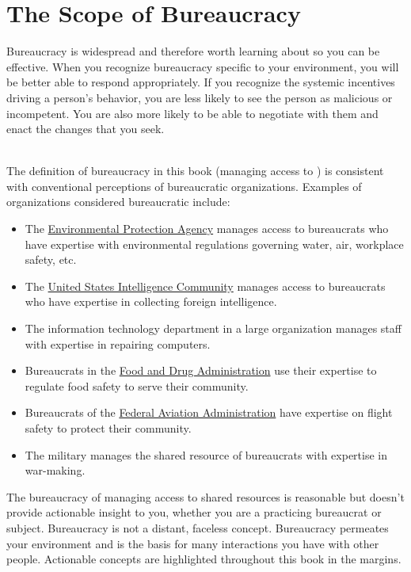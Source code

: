 \section{The Scope of Bureaucracy}
Bureaucracy is widespread and therefore worth learning about so you can be effective.  When you recognize bureaucracy specific to your environment, you will be better able to respond appropriately. If you recognize the systemic incentives driving a person's behavior, you are less likely to see the person as malicious or incompetent. You are also more likely to be able to negotiate with them and enact the changes that you seek.

\ \\

The definition of bureaucracy in this book (managing access to 
\iftoggle{glossarysubstitutionworks}{\glspl{shared resource}}{shared resources}) 
is consistent with conventional perceptions of bureaucratic organizations. 
Examples of organizations considered bureaucratic include:
  \begin{itemize}
      \item The \href{https://www.epa.gov/}{Environmental Protection Agency} manages access to bureaucrats who have expertise with environmental regulations governing water, air, workplace safety, etc.
      \item The \href{https://www.intelligence.gov/}{United States Intelligence Community} manages access to bureaucrats who have expertise in collecting foreign intelligence.
      \item The information technology department in a large organization manages staff with expertise in repairing computers.%
      \item Bureaucrats in the \href{https://www.fda.gov/}{Food and Drug Administration} use their expertise to regulate food safety to serve their community.%
      \item Bureaucrats of the \href{https://www.faa.gov/}{Federal Aviation Administration} have expertise on flight safety to protect their community.%
      \item The military manages the shared resource of bureaucrats with expertise in war-making.
  \end{itemize}

The bureaucracy of managing access to shared resources is reasonable but doesn't provide actionable insight to you, whether you are a practicing bureaucrat or subject. Bureaucracy is not a distant, faceless concept. Bureaucracy permeates your environment and is the basis for many interactions you have with other people. Actionable concepts are highlighted throughout this book in the margins.

